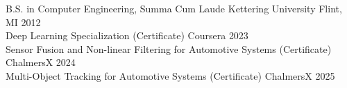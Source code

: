 \begin{samepage}
  \iflongform
    \nopagebreak
  \else
  \fi


  \begin{cventries}

    \cventryeducation
    {B.S. in Computer Engineering, Summa Cum Laude} %
    {Kettering University} %
    {Flint, MI} %
    {2012} %
    \iflongform
    \else
      \\\cventryeducation
      {Deep Learning Specialization (Certificate)} %
      {Coursera} %
      {} %
      {2023} %
      \\\cventryeducation
      {Sensor Fusion and Non-linear Filtering for Automotive Systems (Certificate)} %
      {ChalmersX} %
      {} %
      {2024} %
      \\\cventryeducation
      {Multi-Object Tracking for Automotive Systems (Certificate)} %
      {ChalmersX} %
      {} %
      {2025} %
    \fi

  \end{cventries}
\end{samepage}